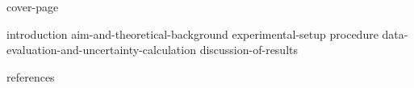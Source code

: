\documentclass[11pt,a4paper,oneside,open=any,parskip=half]{labreport}
\begin{document}
{cover-page}
\thispagestyle{empty}
\clearpage
{}

\tableofcontents
\clearpage
{}

{introduction}
{aim-and-theoretical-background}
{experimental-setup}
{procedure}
{data-evaluation-and-uncertainty-calculation}
{discussion-of-results}

{references}

\clearpage
{}

\end{document}
